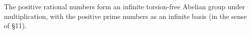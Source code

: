 The positive rational numbers form an infinite torsion-free Abelian group under multiplication, with the positive prime numbers as an infinite basis (in the sense of §11).
